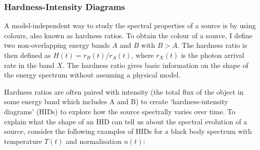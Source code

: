 \subsubsection{Hardness-Intensity Diagrams}

\label{sec:hids}

\par A model-independent way to study the spectral properties of a source is by using colours, also known as hardness ratios.  To obtain the colour of a source, I define two non-overlapping energy bands $A$ and $B$ with $B>A$.  The hardness ratio is then defined as $H(t)=r_B(t)/r_A(t)$, where $r_X(t)$ is the photon arrival rate in the band $X$.  The hardness ratio gives basic information on the shape of the energy spectrum without assuming a physical model.
\par Hardness ratios are often paired with intensity (the total flux of the object in some energy band which includes A and B) to create `hardness-intensity diagrams' (HIDs) to explore how the source spectrally varies over time.  To explain what the shape of an HID can tell us about the spectral evolution of a source, consider the following examples of HIDs for a black body spectrum with temperature $T(t)$ and normalisation $n(t)$:
